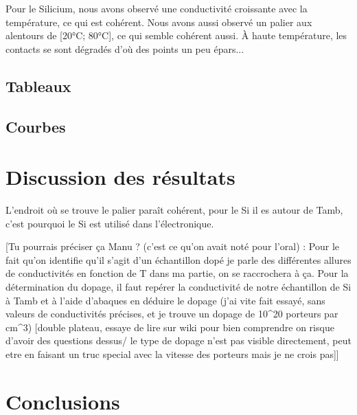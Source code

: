 Pour le Silicium, nous avons observé une conductivité croissante avec la température, ce qui est cohérent. Nous avons aussi observé un palier aux alentours de [20°C; 80°C], ce qui semble cohérent aussi.
À haute température, les contacts se sont dégradés d'où des points un peu épars...


\subsection*{Tableaux}

\subsection*{Courbes}


\section*{Discussion des résultats}
L'endroit où se trouve le palier paraît cohérent, pour le Si il es autour de Tamb, c'est pourquoi le Si est utilisé dans l'électronique.


[Tu pourrais préciser ça Manu ? (c'est ce qu'on avait noté pour l'oral) : 
Pour le fait qu'on identifie qu'il s'agit d'un échantillon dopé je parle des différentes allures de conductivités en fonction de T dans ma partie, on se raccrochera à ça.
Pour la détermination du dopage, il faut repérer la conductivité de notre échantillon de Si à Tamb et à l'aide d'abaques en déduire le dopage (j'ai vite fait essayé, sans valeurs de conductivités précises, et je trouve un dopage de 10^20 porteurs par cm^3)
    [double plateau, essaye de lire sur wiki pour bien comprendre on risque d'avoir des questions dessus/ le type de dopage n'est pas visible directement, peut etre en faisant un truc special avec la vitesse des porteurs mais je ne crois pas]]


\section*{Conclusions}

